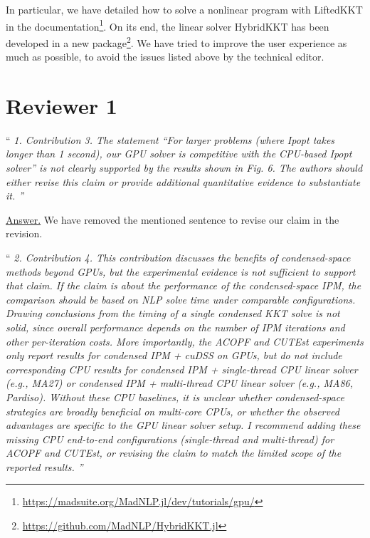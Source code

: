 \documentclass[10pt,a4paper]{article}
\newenvironment{quotereviewer}{\vspace{.5cm}{\underline\reviewername} ``\it\footnotesize}{''}
\newcommand{\answer}{\vspace{1mm}\underline{Answer.} }
\begin{document}
In particular, we have detailed how to solve a nonlinear program
with LiftedKKT in the documentation\footnote{\url{https://madsuite.org/MadNLP.jl/dev/tutorials/gpu/}}.
On its end, the linear solver HybridKKT has been developed in a new package\footnote{\url{https://github.com/MadNLP/HybridKKT.jl}}.
We have tried to improve the user experience as much as possible, to avoid the issues listed
above by the technical editor.


\section{Reviewer 1}
\def\reviewername{Reviewer~\#1}
\bigskip

\begin{quotereviewer}
1. Contribution 3. The statement “For larger problems (where Ipopt takes longer than 1 second), our
GPU solver is competitive with the CPU-based Ipopt solver” is not clearly supported by the results
shown in Fig. 6. The authors should either revise this claim or provide additional quantitative evidence
to substantiate it.
\end{quotereviewer}

\answer
We have removed the mentioned sentence to revise our claim in the revision.

\begin{quotereviewer}
2. Contribution 4. This contribution discusses the benefits of condensed-space methods beyond GPUs,
but the experimental evidence is not sufficient to support that claim. If the claim is about the performance of the condensed-space IPM, the comparison should be based on NLP solve time under comparable configurations. Drawing conclusions from the timing of a single condensed KKT solve is not solid,
since overall performance depends on the number of IPM iterations and other per-iteration costs. More
importantly, the ACOPF and CUTEst experiments only report results for condensed IPM + cuDSS
on GPUs, but do not include corresponding CPU results for condensed IPM + single-thread CPU
linear solver (e.g., MA27) or condensed IPM + multi-thread CPU linear solver (e.g., MA86, Pardiso).
Without these CPU baselines, it is unclear whether condensed-space strategies are broadly beneficial
on multi-core CPUs, or whether the observed advantages are specific to the GPU linear solver setup. I
recommend adding these missing CPU end-to-end configurations (single-thread and multi-thread) for
ACOPF and CUTEst, or revising the claim to match the limited scope of the reported results.
\end{quotereviewer}
\end{document}
